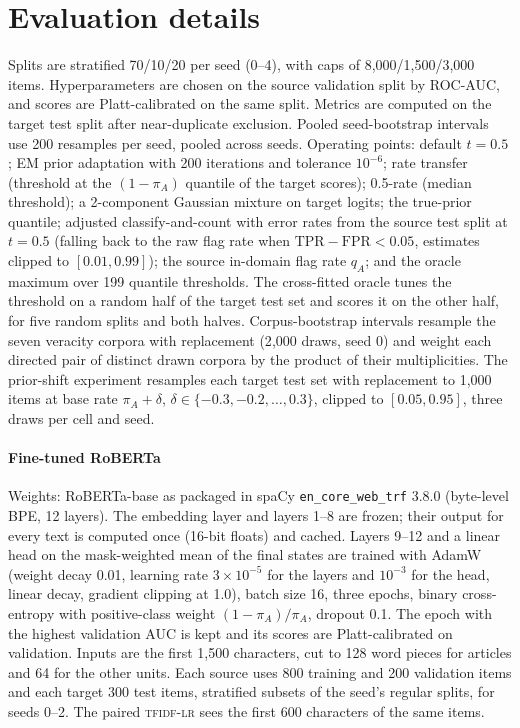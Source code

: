 \documentclass[11pt]{article}
\begin{document}
\section{Evaluation details}
Splits are stratified 70/10/20 per seed (0--4), with caps of 8{,}000/1{,}500/3{,}000 items. Hyperparameters are chosen on the source validation split by ROC-AUC, and scores are Platt-calibrated on the same split. Metrics are computed on the target test split after near-duplicate exclusion. Pooled seed-bootstrap intervals use 200 resamples per seed, pooled across seeds. Operating points: default $t=0.5$; EM prior adaptation \citep{saerens2002adjusting} with 200 iterations and tolerance $10^{-6}$; rate transfer (threshold at the $(1-\pi_A)$ quantile of the target scores); 0.5-rate (median threshold); a 2-component Gaussian mixture on target logits; the true-prior quantile; adjusted classify-and-count \citep{forman2008quantifying} with error rates from the source test split at $t=0.5$ (falling back to the raw flag rate when $\mathrm{TPR}-\mathrm{FPR}<0.05$, estimates clipped to $[0.01,0.99]$); the source in-domain flag rate $q_A$; and the oracle maximum over 199 quantile thresholds. The cross-fitted oracle tunes the threshold on a random half of the target test set and scores it on the other half, for five random splits and both halves. Corpus-bootstrap intervals resample the seven veracity corpora with replacement (2{,}000 draws, seed 0) and weight each directed pair of distinct drawn corpora by the product of their multiplicities. The prior-shift experiment resamples each target test set with replacement to 1{,}000 items at base rate $\pi_A+\delta$, $\delta\in\{-0.3,-0.2,\dots,0.3\}$, clipped to $[0.05,0.95]$, three draws per cell and seed.

\paragraph{Fine-tuned RoBERTa}
Weights: RoBERTa-base as packaged in spaCy \texttt{en\_core\_web\_trf} 3.8.0 (byte-level BPE, 12 layers). The embedding layer and layers 1--8 are frozen; their output for every text is computed once (16-bit floats) and cached. Layers 9--12 and a linear head on the mask-weighted mean of the final states are trained with AdamW (weight decay 0.01, learning rate $3\times10^{-5}$ for the layers and $10^{-3}$ for the head, linear decay, gradient clipping at 1.0), batch size 16, three epochs, binary cross-entropy with positive-class weight $(1-\pi_A)/\pi_A$, dropout 0.1. The epoch with the highest validation AUC is kept and its scores are Platt-calibrated on validation. Inputs are the first 1{,}500 characters, cut to 128 word pieces for articles and 64 for the other units. Each source uses 800 training and 200 validation items and each target 300 test items, stratified subsets of the seed's regular splits, for seeds 0--2. The paired \textsc{tfidf-lr} sees the first 600 characters of the same items.

\end{document}
